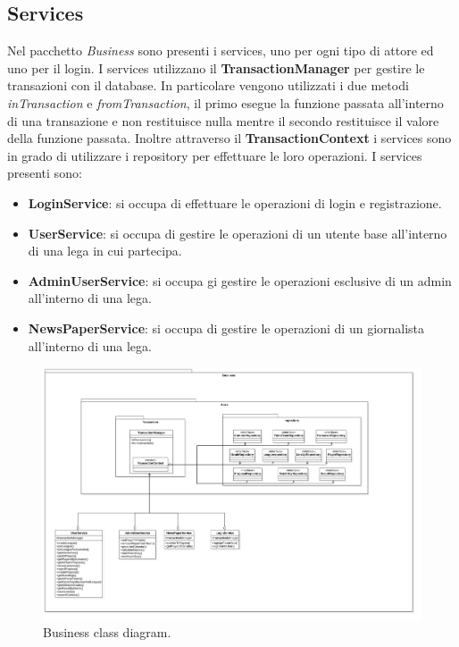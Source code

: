 \subsection{Services}
Nel pacchetto \textit{Business} sono presenti i services, uno per ogni tipo di attore ed uno per il login.
I services utilizzano il \textbf{TransactionManager} per gestire le transazioni con il database.
In particolare vengono utilizzati i due metodi \textit{inTransaction} e \textit{fromTransaction}, il primo esegue la funzione
 passata all'interno di una transazione e non restituisce nulla mentre il secondo restituisce
 il valore della funzione passata. Inoltre attraverso il \textbf{TransactionContext} i services
 sono in grado di utilizzare i repository per effettuare le loro operazioni.
 I services presenti sono:
 \begin{itemize}
    \item \textbf{LoginService}: si occupa di effettuare le operazioni di login e registrazione.
    \item \textbf{UserService}: si occupa di gestire le operazioni di un utente base all'interno di una lega in cui partecipa.
    \item \textbf{AdminUserService}: si occupa gi gestire le operazioni esclusive di un admin all'interno di una lega.
    \item \textbf{NewsPaperService}: si occupa di gestire le operazioni di un giornalista all'interno di una lega.
 \end{itemize}

\begin{figure}
    \centering
    \includegraphics[width=\textwidth]{Resources/graficiUML/BusinessClassDiagram.png}        
    \caption{Business class diagram.}
    \label{fig:business_class_diagram2}
\end{figure}

